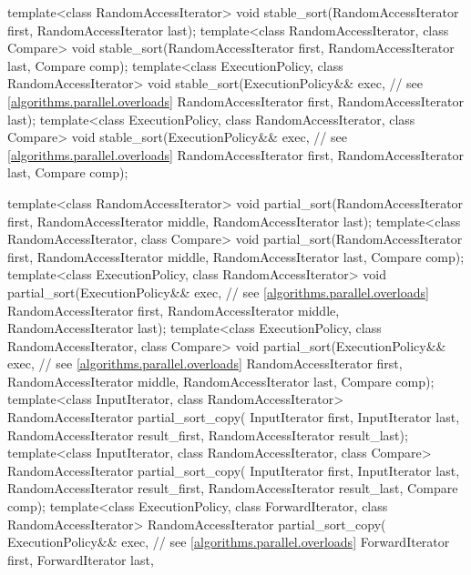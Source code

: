 \begin{codeblock}
{  template<class RandomAccessIterator>
    void stable_sort(RandomAccessIterator first, RandomAccessIterator last);
  template<class RandomAccessIterator, class Compare>
    void stable_sort(RandomAccessIterator first, RandomAccessIterator last,
                     Compare comp);
  template<class ExecutionPolicy, class RandomAccessIterator>
    void stable_sort(ExecutionPolicy&& exec, // see \ref{algorithms.parallel.overloads}
                     RandomAccessIterator first, RandomAccessIterator last);
  template<class ExecutionPolicy, class RandomAccessIterator, class Compare>
    void stable_sort(ExecutionPolicy&& exec, // see \ref{algorithms.parallel.overloads}
                     RandomAccessIterator first, RandomAccessIterator last,
                     Compare comp);

  template<class RandomAccessIterator>
    void partial_sort(RandomAccessIterator first,
                      RandomAccessIterator middle,
                      RandomAccessIterator last);
  template<class RandomAccessIterator, class Compare>
    void partial_sort(RandomAccessIterator first,
                      RandomAccessIterator middle,
                      RandomAccessIterator last, Compare comp);
  template<class ExecutionPolicy, class RandomAccessIterator>
    void partial_sort(ExecutionPolicy&& exec, // see \ref{algorithms.parallel.overloads}
                      RandomAccessIterator first,
                      RandomAccessIterator middle,
                      RandomAccessIterator last);
  template<class ExecutionPolicy, class RandomAccessIterator, class Compare>
    void partial_sort(ExecutionPolicy&& exec, // see \ref{algorithms.parallel.overloads}
                      RandomAccessIterator first,
                      RandomAccessIterator middle,
                      RandomAccessIterator last, Compare comp);
  template<class InputIterator, class RandomAccessIterator>
    RandomAccessIterator partial_sort_copy(
      InputIterator first, InputIterator last,
      RandomAccessIterator result_first,
      RandomAccessIterator result_last);
  template<class InputIterator, class RandomAccessIterator, class Compare>
    RandomAccessIterator partial_sort_copy(
      InputIterator first, InputIterator last,
      RandomAccessIterator result_first,
      RandomAccessIterator result_last,
      Compare comp);
  template<class ExecutionPolicy, class ForwardIterator, class RandomAccessIterator>
    RandomAccessIterator partial_sort_copy(
      ExecutionPolicy&& exec,  // see \ref{algorithms.parallel.overloads}
      ForwardIterator first, ForwardIterator last,
}
\end{codeblock}
